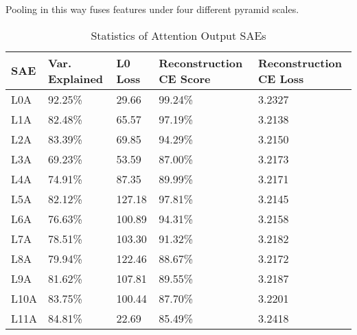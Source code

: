 \documentclass{article}
\begin{document}

 Pooling in this way fuses features under four different pyramid scales.

\begin{table}
    \caption{Statistics of Attention Output SAEs}
    
    \begin{tabular}{lllll}
        \toprule
        SAE & Var. Explained & L0 Loss & Reconstruction CE Score & Reconstruction CE Loss \\
        \midrule
        L0A & 92.25\% & 29.66 & 99.24\% & 3.2327 \\
        L1A & 82.48\% & 65.57 & 97.19\% & 3.2138 \\
        L2A & 83.39\% & 69.85 & 94.29\% & 3.2150 \\
        L3A & 69.23\% & 53.59 & 87.00\% & 3.2173 \\
        L4A & 74.91\% & 87.35 & 89.99\% & 3.2171 \\
        L5A & 82.12\% & 127.18 & 97.81\% & 3.2145 \\
        L6A & 76.63\% & 100.89 & 94.31\% & 3.2158 \\
        L7A & 78.51\% & 103.30 & 91.32\% & 3.2182 \\
        L8A & 79.94\% & 122.46 & 88.67\% & 3.2172 \\
        L9A & 81.62\% & 107.81 & 89.55\% & 3.2187 \\
        L10A & 83.75\% & 100.44 & 87.70\% & 3.2201 \\
        L11A & 84.81\% & 22.69 & 85.49\% & 3.2418 \\
        \bottomrule
    \end{tabular}
\end{table}
\end{document}

